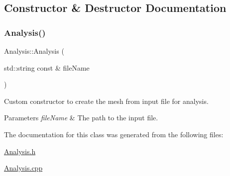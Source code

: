 \subsection{Constructor \& Destructor Documentation}
\mbox{\label{class_analysis_aae14526bb70c6372fd662b46aab74d2d}} 
\subsubsection{\texorpdfstring{Analysis()}{Analysis()}}
{\footnotesize\ttfamily Analysis\+::\+Analysis (\begin{DoxyParamCaption}\item[{std\+::string const \&}]{file\+Name }\end{DoxyParamCaption})}



Custom constructor to create the mesh from input file for analysis. 


\begin{DoxyParams}{Parameters}
{\em file\+Name} & The path to the input file. \\
\hline
\end{DoxyParams}


The documentation for this class was generated from the following files\+:\begin{DoxyCompactItemize}
\item 
\mbox{\hyperlink{_analysis_8h}{Analysis.\+h}}\item 
\mbox{\hyperlink{_analysis_8cpp}{Analysis.\+cpp}}\end{DoxyCompactItemize}
